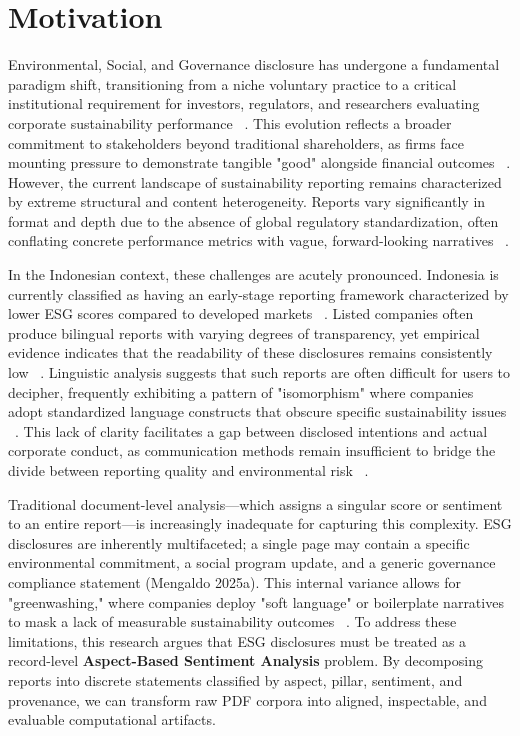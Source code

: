 \section{Motivation}

Environmental, Social, and Governance disclosure has undergone a fundamental paradigm shift, transitioning from a niche voluntary practice to a critical institutional requirement for investors, regulators, and researchers evaluating corporate sustainability performance  ~\cite{hans_bonde_christensen_45b44695}. This evolution reflects a broader commitment to stakeholders beyond traditional shareholders, as firms face mounting pressure to demonstrate tangible "good" alongside financial outcomes  ~\cite{hans_bonde_christensen_45b44695}. However, the current landscape of sustainability reporting remains characterized by extreme structural and content heterogeneity. Reports vary significantly in format and depth due to the absence of global regulatory standardization, often conflating concrete performance metrics with vague, forward-looking narratives  ~\cite[]{ellen_pei_yi_yu_4668244e, hans_bonde_christensen_45b44695}.

In the Indonesian context, these challenges are acutely pronounced. Indonesia is currently classified as having an early-stage reporting framework characterized by lower ESG scores compared to developed markets  ~\cite{monica_singhania_286966ff}. Listed companies often produce bilingual reports with varying degrees of transparency, yet empirical evidence indicates that the readability of these disclosures remains consistently low  ~\cite{desi_adhariani_toit_543335d6}. Linguistic analysis suggests that such reports are often difficult for users to decipher, frequently exhibiting a pattern of "isomorphism" where companies adopt standardized language constructs that obscure specific sustainability issues  ~\cite{desi_adhariani_toit_543335d6}. This lack of clarity facilitates a gap between disclosed intentions and actual corporate conduct, as communication methods remain insufficient to bridge the divide between reporting quality and environmental risk  ~\cite[]{marsdenia_010e13e7, iman_harymawan_2ef898fe}.

Traditional document-level analysis—which assigns a singular score or sentiment to an entire report—is increasingly inadequate for capturing this complexity. ESG disclosures are inherently multifaceted; a single page may contain a specific environmental commitment, a social program update, and a generic governance compliance statement (Mengaldo 2025a). This internal variance allows for "greenwashing," where companies deploy "soft language" or boilerplate narratives to mask a lack of measurable sustainability outcomes  ~\cite{habiba_al_shaer_c2f5394b}. To address these limitations, this research argues that ESG disclosures must be treated as a record-level \textbf{Aspect-Based Sentiment Analysis} problem. By decomposing reports into discrete statements classified by aspect, pillar, sentiment, and provenance, we can transform raw PDF corpora into aligned, inspectable, and evaluable computational artifacts.
